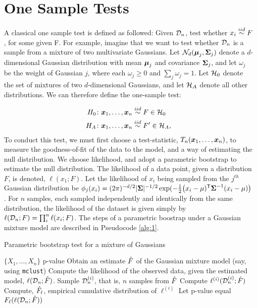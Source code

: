 \documentclass[final,leqno]{article}
\begin{document}
\section{One Sample Tests}

A classical one sample test is defined as followed: Given $\mathcal{D}_n$, test whether $x_i \overset{iid}{\sim} F$, for some given F.  For example, imagine that we want to test whether $\mathcal{D}_n$ is a sample from a mixture of two multivariate Gaussians. Let $\mathcal{N}_d(\boldsymbol{\mu}_j,\boldsymbol{\Sigma}_j)$ denote a $d$-dimensional Gaussian distribution with mean $\boldsymbol{\mu}_j$ and covariance $\boldsymbol{\Sigma}_j$, and let $\omega_j$ be the weight of Gaussian $j$, where each $\omega_j \geq 0$ and $\sum_j \omega_j=1$.  Let $\mathcal{H}_0$ denote the set of mixtures of two $d$-dimensional Gaussians, and let $\mathcal{H}_A$ denote all other distributions.  We can therefore define the one-sample test:

\begin{align}
H_0 {\colon} & \boldsymbol{x}_1,\ldots,\boldsymbol{x}_n \overset{iid}{\sim} F \in \mathcal{H}_0  \\
H_A {\colon} & \boldsymbol{x}_1,\ldots,\boldsymbol{x}_n \overset{iid}{\sim} F' \in \mathcal{H}_A,
\end{align}
\noindent To conduct this test, we must first choose a test-statistic, $T_n(\boldsymbol{x}_1,\ldots,\boldsymbol{x}_n)$, to measure the goodness-of-fit of the data to the model, and a way of estimating the null distribution.  We choose likelihood, and adopt a parametric bootstrap to estimate the null distribution.  The likelihood of a data point, given a distribution $F$, is denoted, $\ell(x_1; F)$.  Let the likelihood of $x_i$ being sampled from the $j^{th}$ Gaussian distribution be $\phi_j(x_i)=(2\pi)^{-d/2} | \boldsymbol{\Sigma}|^{-1/2} \exp ( -\frac{1}{2} \big(x_i - \mu)^{\mathsf{T}} \boldsymbol{\Sigma}^{-1}(x_i-\mu)\big)$. For $n$ samples, each sampled independently and identically from the same distribution, the likelihood of the dataset is given simply by $\ell(\mathcal{D}_n; F) = \prod_i^n \ell(x_i; F)$. The steps of a parametric boostrap under a Gaussian mixture model are described in Pseudocode \ref{alg:1}.

\begin{algorithm} 
\caption{Parametric bootstrap test for a mixture of Gaussians} 
\label{alg:1}
\begin{algorithmic}[1]
\REQUIRE $\{X_1,\ldots,X_n\}$
\ENSURE p-value
\STATE Obtain an estimate $\hat{F}$ of the Gaussian mixture model (say, using \texttt{mclust})
\STATE Compute the likelihood of the observed data, given the estimated model, $\ell(\mathcal{D}_n;\hat{F})$.
\STATE Sample $\mathcal{D}_n^{(i)}$, that is, $n$ samples from $\hat{F}$
\STATE Compute $\ell^{(i)}(\mathcal{D}^{(i)}_n;\hat{F})$
\ENDFOR
\STATE Compute, $\hat{F}_{\ell}$, empirical cumulative distribution of $\ell^{(i)}$
\STATE Let p-value equal $F_{\ell}(\ell(\mathcal{D}_n; \hat{F}))$
\end{algorithmic} 
\end{algorithm}
\end{document}
